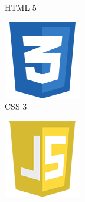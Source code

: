 \begin{figure}[H]
\begin{subfigure}[t]{0.2\linewidth}
        \caption{HTML 5}\label{fig:HTML_5}
    \end{subfigure}
    \quad
    \begin{subfigure}[t]{0.2\linewidth}
        \centering
        \includegraphics[width=\linewidth]{Images/Generic/Icons/CSS_3}
        \caption{CSS 3}\label{fig:CSS_3}
    \end{subfigure}
    \quad
    \begin{subfigure}[t]{0.2\linewidth}
        \centering
        \includegraphics[width=\linewidth]{Images/Generic/Icons/JavaScript}

\end{subfigure}
\end{figure}
